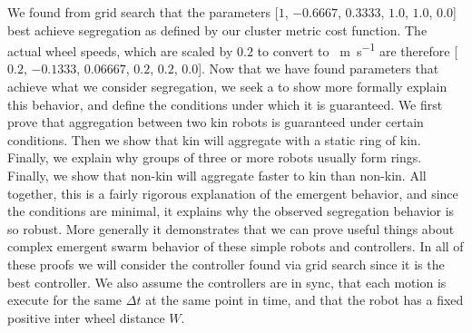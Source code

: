 \documentclass[conference]{IEEEtran}
\begin{document}
  We found from grid search that the parameters [$1$, $-0.6667$, $0.3333$, $1.0$, $1.0$, $0.0$] best achieve segregation as defined by our cluster metric cost function. The actual wheel speeds, which are scaled by $0.2$ to convert to \SI{}{\meter\per\second} are therefore [$0.2$, $-0.1333$, $0.06667$, $0.2$, $0.2$, $0.0$]. Now that we have found parameters that achieve what we consider segregation, we seek a to show more formally explain this behavior, and define the conditions under which it is guaranteed. We first prove that aggregation between two kin robots is guaranteed under certain conditions. Then we show that kin will aggregate with a static ring of kin. Finally, we explain why groups of three or more robots usually form rings. Finally, we show that non-kin will aggregate faster to kin than non-kin. All together, this is a fairly rigorous explanation of the emergent behavior, and since the conditions are minimal, it explains why the observed segregation behavior is so robust. More generally it demonstrates that we can prove useful things about complex emergent swarm behavior of these simple robots and controllers. In all of these proofs we will consider the controller found via grid search since it is the best controller. We also assume the controllers are in sync, that each motion is execute for the same $\Delta t$ at the same point in time, and that the robot has a fixed positive inter wheel distance $W$.
\end{document}
